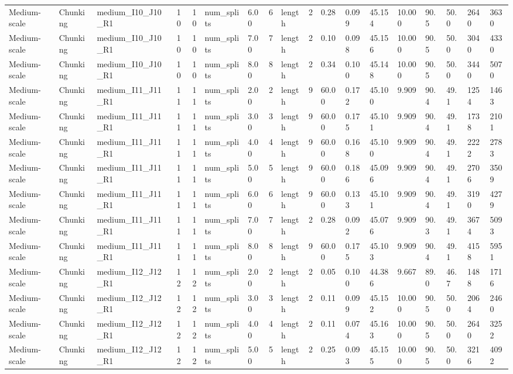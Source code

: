 \begin{longtable}{lllrrllllrllllllll}
Medium-scale & Chunking & medium\_I10\_J10\_R1 & 10 & 10 & num\_splits & 6.00 & 6 & length & 2 & 0.28 & 0.099 & 45.154 & 10.000 & 90.5 & 50.0 & 2640 & 3630 \\
Medium-scale & Chunking & medium\_I10\_J10\_R1 & 10 & 10 & num\_splits & 7.00 & 7 & length & 2 & 0.10 & 0.098 & 45.156 & 10.000 & 90.5 & 50.0 & 3040 & 4330 \\
Medium-scale & Chunking & medium\_I10\_J10\_R1 & 10 & 10 & num\_splits & 8.00 & 8 & length & 2 & 0.34 & 0.100 & 45.148 & 10.000 & 90.5 & 50.0 & 3440 & 5070 \\
Medium-scale & Chunking & medium\_I11\_J11\_R1 & 11 & 11 & num\_splits & 2.00 & 2 & length & 9 & 60.00 & 0.172 & 45.100 & 9.909 & 90.4 & 49.1 & 1254 & 1463 \\
Medium-scale & Chunking & medium\_I11\_J11\_R1 & 11 & 11 & num\_splits & 3.00 & 3 & length & 9 & 60.00 & 0.175 & 45.101 & 9.909 & 90.4 & 49.1 & 1738 & 2101 \\
Medium-scale & Chunking & medium\_I11\_J11\_R1 & 11 & 11 & num\_splits & 4.00 & 4 & length & 9 & 60.00 & 0.168 & 45.100 & 9.909 & 90.4 & 49.1 & 2222 & 2783 \\
Medium-scale & Chunking & medium\_I11\_J11\_R1 & 11 & 11 & num\_splits & 5.00 & 5 & length & 9 & 60.00 & 0.186 & 45.096 & 9.909 & 90.4 & 49.1 & 2706 & 3509 \\
Medium-scale & Chunking & medium\_I11\_J11\_R1 & 11 & 11 & num\_splits & 6.00 & 6 & length & 9 & 60.00 & 0.133 & 45.101 & 9.909 & 90.4 & 49.1 & 3190 & 4279 \\
Medium-scale & Chunking & medium\_I11\_J11\_R1 & 11 & 11 & num\_splits & 7.00 & 7 & length & 2 & 0.28 & 0.092 & 45.076 & 9.909 & 90.3 & 49.1 & 3674 & 5093 \\
Medium-scale & Chunking & medium\_I11\_J11\_R1 & 11 & 11 & num\_splits & 8.00 & 8 & length & 9 & 60.00 & 0.175 & 45.103 & 9.909 & 90.4 & 49.1 & 4158 & 5951 \\
Medium-scale & Chunking & medium\_I12\_J12\_R1 & 12 & 12 & num\_splits & 2.00 & 2 & length & 2 & 0.05 & 0.100 & 44.386 & 9.667 & 89.0 & 46.7 & 1488 & 1716 \\
Medium-scale & Chunking & medium\_I12\_J12\_R1 & 12 & 12 & num\_splits & 3.00 & 3 & length & 2 & 0.11 & 0.099 & 45.152 & 10.000 & 90.5 & 50.0 & 2064 & 2460 \\
Medium-scale & Chunking & medium\_I12\_J12\_R1 & 12 & 12 & num\_splits & 4.00 & 4 & length & 2 & 0.11 & 0.074 & 45.163 & 10.000 & 90.5 & 50.0 & 2640 & 3252 \\
Medium-scale & Chunking & medium\_I12\_J12\_R1 & 12 & 12 & num\_splits & 5.00 & 5 & length & 2 & 0.25 & 0.093 & 45.155 & 10.000 & 90.5 & 50.0 & 3216 & 4092 \\

\end{longtable}
